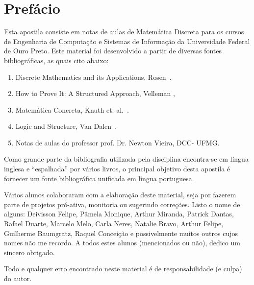 \chapter*{Prefácio}

Esta apostila consiste em notas de aulas de Matemática Discreta para
os cursos de Engenharia de Computação e Sistemas de Informação da
Universidade Federal de Ouro Preto. Este material foi desenvolvido a
partir de diversas fontes bibliográficas, as quais cito abaixo:
\begin{enumerate}
  \item Discrete Mathematics and its Applications, Rosen~\cite{Rosen02}.
  \item How to Prove It: A Structured Approach, Velleman
    \cite{Velleman06},
  \item Matemática Concreta, Knuth et. al.~\cite{Graham94}.
  \item Logic and Structure, Van Dalen~\cite{Dalen94}.
  \item Notas de aulas do professor prof. Dr. Newton Vieira, DCC- UFMG.
\end{enumerate}

Como grande parte da bibliografia utilizada pela disciplina
encontra-se em língua inglesa e ``espalhada'' por vários livros,
o principal objetivo desta apostila é fornecer um fonte bibliográfica
unificada em língua portuguesa.

Vários alunos colaboraram com a elaboração deste material, seja por
fazerem parte de projetos pró-ativa, monitoria ou sugerindo correções. Listo o
nome de alguns: Deivisson Felipe, Pâmela Monique, Arthur
Miranda, Patrick Dantas, Rafael Duarte, Marcelo Melo, Carla Neres,
Natalie Bravo, Arthur Felipe, Guilherme Baumgratz, Raquel Conceição e
possivelmente muitos outros cujos nomes não me recordo.
A todos estes alunos (mencionados ou não), dedico um sincero obrigado.

Todo e qualquer erro encontrado neste material é de responsabilidade (e culpa)
do autor.
